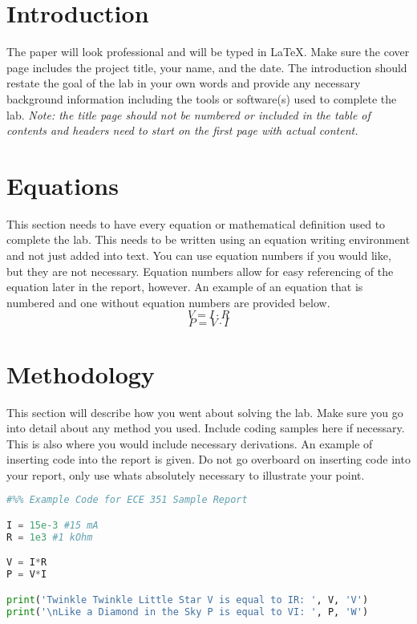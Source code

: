 \documentclass[12pt]{report}
\begin{document}
\section{Introduction}
 

The paper will look professional and will be typed in \LaTeX. Make sure the cover page includes the project title, your name, and the date. The introduction should restate the goal of the lab in your own words and provide any necessary background information including the tools or software(s) used to complete the lab. \textit{Note: the title page should not be numbered or included in the table of contents and headers need to start on the first page with actual content.}

\section{Equations}

This section needs to have every equation or mathematical definition used to complete the lab. This needs to be written using an equation writing environment and not just added into text. You can use equation numbers if you would like, but they are not necessary. Equation numbers allow for easy referencing of the equation later in the report, however. An example of an equation that is numbered and one without equation numbers are provided below.
\begin{equation}
    V = I\cdot R
\end{equation}
\begin{equation*}
    P = V\cdot I
\end{equation*}

\section{Methodology}

This section will describe how you went about solving the lab. Make sure you go into detail about any method you used. Include coding samples here if necessary. This is also where you would include necessary derivations. An example of inserting code into the report is given. Do not go overboard on inserting code into your report, only use whats absolutely necessary to illustrate your point.
\begin{lstlisting}[language=Python]
#%% Example Code for ECE 351 Sample Report

I = 15e-3 #15 mA
R = 1e3 #1 kOhm

V = I*R
P = V*I

print('Twinkle Twinkle Little Star V is equal to IR: ', V, 'V')
print('\nLike a Diamond in the Sky P is equal to VI: ', P, 'W')
\end{lstlisting}
\end{document}
